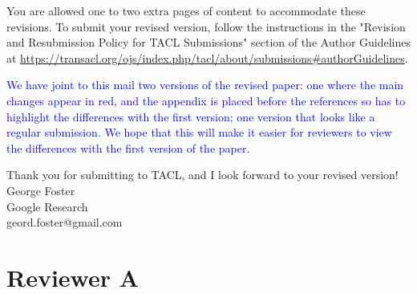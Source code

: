 \documentclass[12pt,times,a4paper,twoside]{article}
\theoremstyle{definition}
\begin{document}
You are allowed one to two extra pages of content to accommodate these revisions. To submit your revised version, follow the instructions in the "Revision and Resubmission Policy for TACL Submissions" section of the
Author Guidelines at \url{https://transacl.org/ojs/index.php/tacl/about/submissions\#authorGuidelines}.

\textcolor{blue}{We have joint to this mail two versions of the revised paper: one where the main changes appear in red, and the appendix is placed before the references so has to highlight the differences with the first version; one version that looks like a regular submission. We hope that this will make it easier for reviewers to view the differences with the first version of the paper.}

Thank you for submitting to TACL, and I look forward to your revised version! \\[2\parskip]

\noindent George Foster\\
\noindent Google Research\\
\noindent geord.foster@gmail.com

\section*{Reviewer A}
\end{document}

